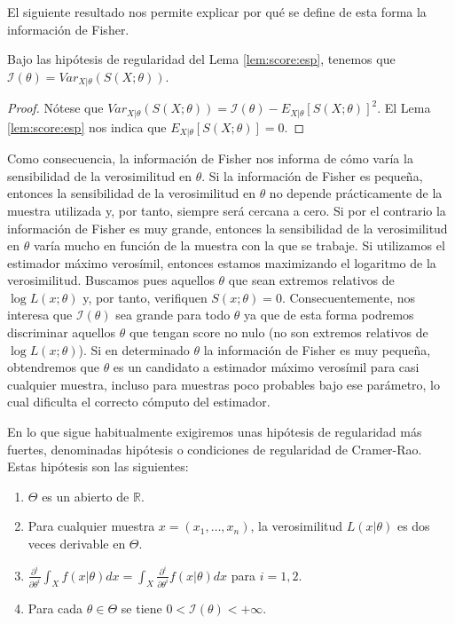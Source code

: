     El siguiente resultado nos permite explicar por qué se define de esta forma la información de Fisher.

    \begin{cor}
        Bajo las hipótesis de regularidad del Lema \ref{lem:score:esp}, tenemos que  $\mathcal{I}(\theta) = Var_{X|\theta}(S(X;\theta))$.
    \end{cor}
    \begin{proof}
        Nótese que $Var_{X|\theta}(S(X;\theta)) = \mathcal{I}(\theta) - E_{X|\theta}[S(X; \theta)]^2$. El Lema \ref{lem:score:esp} nos indica que $E_{X|\theta}[S(X; \theta)] = 0$.
    \end{proof}

    Como consecuencia, la información de Fisher nos informa de cómo varía la sensibilidad de la verosimilitud en $\theta$. Si la información de Fisher es pequeña, entonces la sensibilidad de la verosimilitud en $\theta$ no depende prácticamente de la muestra utilizada y, por tanto, siempre será cercana a cero. Si por el contrario la información de Fisher es muy grande, entonces la sensibilidad de la verosimilitud en $\theta$ varía mucho en función de la muestra con la que se trabaje. Si utilizamos el estimador máximo verosímil, entonces estamos maximizando el logaritmo de la verosimilitud. Buscamos pues aquellos $\theta$ que sean extremos relativos de $\log L(x; \theta)$ y, por tanto, verifiquen $S(x; \theta) = 0$. Consecuentemente, nos interesa que $\mathcal{I}(\theta)$ sea grande para todo $\theta$ ya que de esta forma podremos discriminar aquellos $\theta$ que tengan score no nulo (no son extremos relativos de $\log L(x; \theta)$). Si en determinado $\theta$ la información de Fisher es muy pequeña, obtendremos que $\theta$ es un candidato a estimador máximo verosímil para casi cualquier muestra, incluso para muestras poco probables bajo ese parámetro, lo cual dificulta el correcto cómputo del estimador.

    En lo que sigue habitualmente exigiremos unas hipótesis de regularidad más fuertes, denominadas hipótesis o condiciones de regularidad de Cramer-Rao. Estas hipótesis son las siguientes:

    \begin{enumerate}[label=\roman*)]
        \item $\Theta$ es un abierto de $\mathbb{R}$.
        \item Para cualquier muestra $x = (x_1, \ldots, x_n)$, la verosimilitud $L(x | \theta)$ es dos veces derivable en $\Theta$.
        \item $\frac{\partial^i}{\partial\theta^i} \int_X f(x | \theta) dx = \int_X \frac{\partial^i}{\partial\theta^i} f(x | \theta) dx$ para $i=1,2$.
        \item Para cada $\theta \in \Theta$ se tiene $0 < \mathcal{I}(\theta) < +\infty$.
    \end{enumerate}


